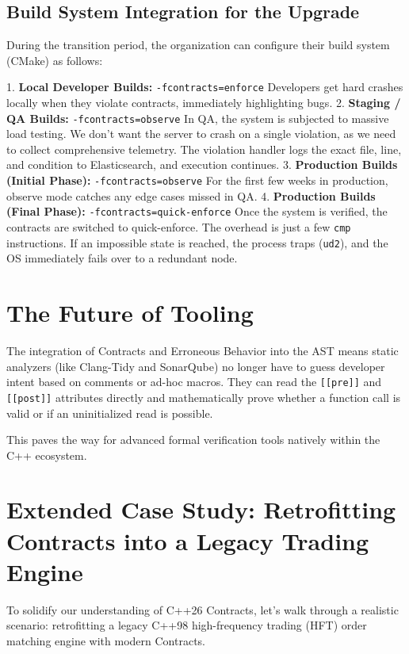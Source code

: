 {{{{{{{{\subsection{Build System Integration for the Upgrade}

During the transition period, the organization can configure their build system (CMake) as follows:

1. \textbf{Local Developer Builds:} \texttt{-fcontracts=enforce} 
   Developers get hard crashes locally when they violate contracts, immediately highlighting bugs.
2. \textbf{Staging / QA Builds:} \texttt{-fcontracts=observe}
   In QA, the system is subjected to massive load testing. We don't want the server to crash on a single violation, as we need to collect comprehensive telemetry. The violation handler logs the exact file, line, and condition to Elasticsearch, and execution continues.
3. \textbf{Production Builds (Initial Phase):} \texttt{-fcontracts=observe}
   For the first few weeks in production, observe mode catches any edge cases missed in QA.
4. \textbf{Production Builds (Final Phase):} \texttt{-fcontracts=quick-enforce}
   Once the system is verified, the contracts are switched to quick-enforce. The overhead is just a few \texttt{cmp} instructions. If an impossible state is reached, the process traps (\texttt{ud2}), and the OS immediately fails over to a redundant node.

\section{The Future of Tooling}

The integration of Contracts and Erroneous Behavior into the AST means static analyzers (like Clang-Tidy and SonarQube) no longer have to guess developer intent based on comments or ad-hoc macros. They can read the \texttt{[[pre]]} and \texttt{[[post]]} attributes directly and mathematically prove whether a function call is valid or if an uninitialized read is possible.

This paves the way for advanced formal verification tools natively within the C++ ecosystem.

\section{Extended Case Study: Retrofitting Contracts into a Legacy Trading Engine}

To solidify our understanding of C++26 Contracts, let's walk through a realistic scenario: retrofitting a legacy C++98 high-frequency trading (HFT) order matching engine with modern Contracts.

}}}}}}}}
